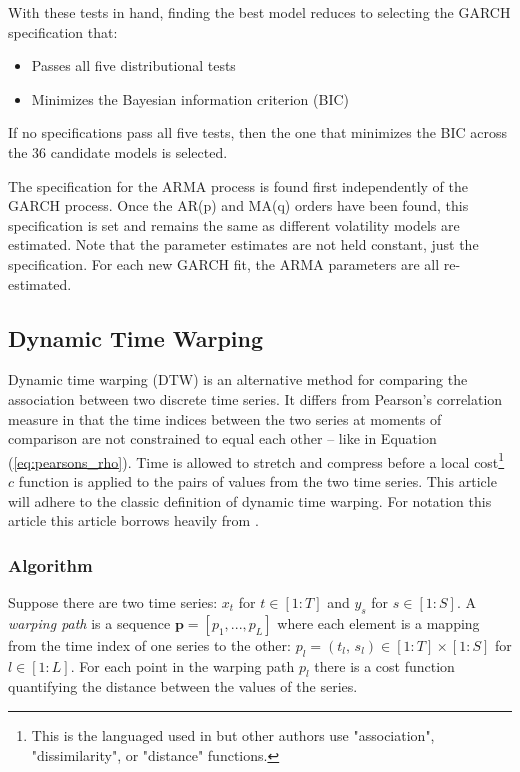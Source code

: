 \documentclass[12pt]{article}
\begin{document}
\begin{enumerate}
    With these tests in hand, finding the best model reduces to selecting the GARCH specification that:
    
    \begin{itemize}
        \item Passes all five distributional tests
        \item Minimizes the Bayesian information criterion (BIC)
    \end{itemize}

    If no specifications pass all five tests, then the one that minimizes the BIC across the 36 candidate models is selected.

\end{enumerate}

The specification for the ARMA process is found first independently of the GARCH process. Once the AR(p) and MA(q) orders have been found, this specification is set and remains the same as different volatility models are estimated. Note that the parameter estimates are not held constant, just the specification. For each new GARCH fit, the ARMA parameters are all re-estimated.


\subsection{Dynamic Time Warping} \label{sec:DTW}

Dynamic time warping (DTW) is an alternative method for comparing the association between two discrete time series. It differs from Pearson's correlation measure in that the time indices between the two series at moments of comparison are not constrained to equal each other -- like in Equation (\ref{eq:pearsons_rho}). Time is allowed to stretch and compress before a local cost\footnote{This is the languaged used in \cite{Mueller2007} but other authors use "association", "dissimilarity", or "distance" functions.} $c$ function is applied to the pairs of values from the two time series. This article will adhere to the classic definition of dynamic time warping. For notation this article this article borrows heavily from \cite{Mueller2007}.

\subsubsection{Algorithm}

Suppose there are two time series: $x_{t}$ for $t \in [1:T]$ and $y_{s}$ for $s \in [1:S]$. A \emph{warping path} is a sequence $\boldsymbol{p} = [p_{1},..., p_{L}]$ where each element is a mapping from the time index of one series to the other: $p_{l} = (t_{l}, \, s_{l}) \in [1:T] \times [1:S]$ for $l \in [1:L]$. For each point in the warping path $p_{l}$ there is a cost function quantifying the distance between the values of the series.
\end{document}
